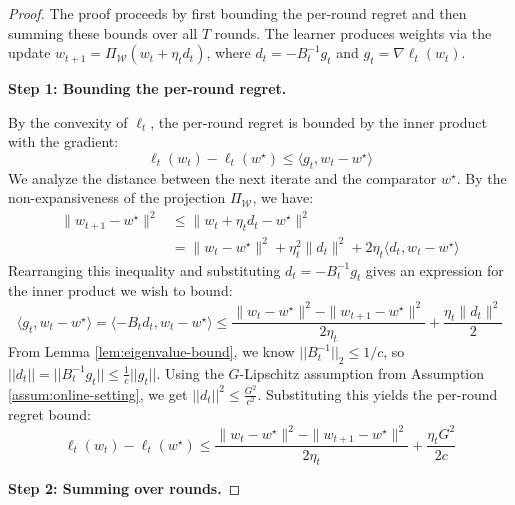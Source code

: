 \documentclass[a4paper,12pt]{article}
\begin{document}
\begin{proof}
The proof proceeds by first bounding the per-round regret and then summing these bounds over all $T$ rounds. The learner produces weights via the update $w_{t+1} = \Pi_{\mathcal{W}}(w_t + \eta_t d_t)$, where $d_t = -B_t^{-1}g_t$ and $g_t = \nabla\ell_t(w_t)$.

\textbf{Step 1: Bounding the per-round regret.}

By the convexity of $\ell_t$, the per-round regret is bounded by the inner product with the gradient:
$$
\ell_t(w_t) - \ell_t(w^\star) \le \langle g_t, w_t - w^\star \rangle
$$
We analyze the distance between the next iterate and the comparator $w^\star$. By the non-expansiveness of the projection $\Pi_{\mathcal{W}}$, we have:
\begin{align*}
    \|w_{t+1} - w^\star\|^2 &\le \|w_t + \eta_t d_t - w^\star\|^2 \\
    &= \|w_t - w^\star\|^2 + \eta_t^2\|d_t\|^2 + 2\eta_t \langle d_t, w_t - w^\star \rangle
\end{align*}
Rearranging this inequality and substituting $d_t = -B_t^{-1}g_t$ gives an expression for the inner product we wish to bound:
$$
\langle g_t, w_t - w^\star \rangle = \langle -B_t d_t, w_t - w^\star \rangle \le \frac{\|w_t - w^\star\|^2 - \|w_{t+1} - w^\star\|^2}{2\eta_t} + \frac{\eta_t\|d_t\|^2}{2}
$$
From Lemma \ref{lem:eigenvalue-bound}, we know $||B_t^{-1}||_2 \le 1/c$, so $||d_t|| = ||B_t^{-1}g_t|| \le \frac{1}{c}||g_t||$. Using the $G$-Lipschitz assumption from Assumption \ref{assum:online-setting}, we get $||d_t||^2 \le \frac{G^2}{c^2}$. Substituting this yields the per-round regret bound:
\begin{equation} \label{eq:per_round_bound}
\ell_t(w_t) - \ell_t(w^\star) \le \frac{\|w_t - w^\star\|^2 - \|w_{t+1} - w^\star\|^2}{2\eta_t} + \frac{\eta_t G^2}{2c}
\end{equation}

\textbf{Step 2: Summing over rounds.}


\end{proof}
\end{document}

